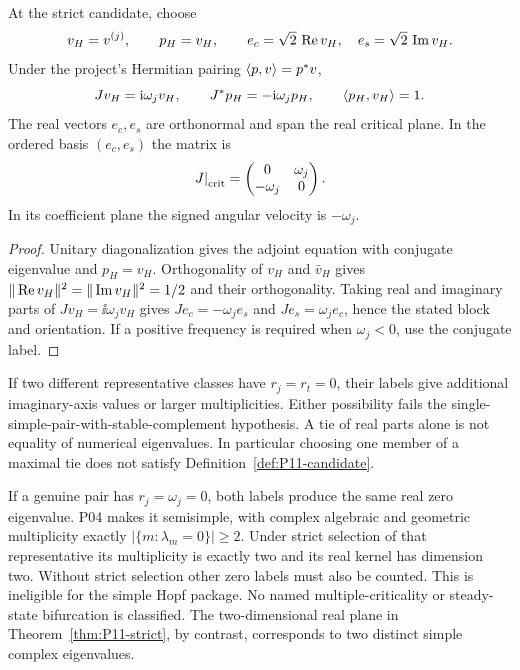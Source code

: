\begin{proposition}
\label{prop:P11-vectors}
At the strict candidate, choose
\begin{equation}
 v_H=v^{(j)},\qquad p_H=v_H,\qquad
 e_c=\sqrt2\,\operatorname{Re} v_H,\quad e_s=\sqrt2\,\operatorname{Im} v_H.
 \label{eq:P11-vectors}
\end{equation}
Under the project's Hermitian pairing $\langle p,v\rangle=p^*v$,
\begin{equation}
 Jv_H=\mathrm{i}\omega_jv_H,\qquad
 J^*p_H=-\mathrm{i}\omega_jp_H,\qquad \langle p_H,v_H\rangle=1.
 \label{eq:P11-adjoint}
\end{equation}
The real vectors $e_c,e_s$ are orthonormal and span the real critical
plane. In the ordered basis $(e_c,e_s)$ the matrix is
\begin{equation}
 \left.J\right|_{\rm crit}=
 \begin{pmatrix}0&\omega_j\\-\omega_j&0\end{pmatrix}.
 \label{eq:P11-real-block}
\end{equation}
In its coefficient plane the signed angular velocity is $-\omega_j$.
\end{proposition}
\begin{proof}
Unitary diagonalization gives the adjoint equation with conjugate
eigenvalue and $p_H=v_H$. Orthogonality of $v_H$ and $\bar v_H$
gives $\|\operatorname{Re} v_H\|^2=\|\operatorname{Im} v_H\|^2=1/2$ and their orthogonality.
Taking real and imaginary parts of $Jv_H=\ii\omega_jv_H$ gives
$Je_c=-\omega_je_s$ and $Je_s=\omega_je_c$, hence the stated block
and orientation. If a positive frequency is required when $\omega_j<0$,
use the conjugate label.
\end{proof}

\begin{remark}
\label{rem:P11-degeneracies}
If two different representative classes have $r_j=r_t=0$, their
labels give additional imaginary-axis values or larger multiplicities.
Either possibility fails the single-simple-pair-with-stable-complement
hypothesis. A tie of real parts alone is not equality of numerical
eigenvalues. In particular choosing one member of a maximal tie does
not satisfy Definition~\ref{def:P11-candidate}.

If a genuine pair has $r_j=\omega_j=0$, both labels produce the
same real zero eigenvalue. P04 makes it semisimple, with complex
algebraic and geometric multiplicity exactly
$|\{m:\lambda_m=0\}|\ge2$. Under strict selection of that
representative its multiplicity is exactly two and its real kernel
has dimension two. Without strict selection other zero labels must
also be counted. This is ineligible for the simple Hopf package.
No named multiple-criticality or steady-state bifurcation is classified.
The two-dimensional real plane in Theorem~\ref{thm:P11-strict}, by
contrast, corresponds to two distinct simple complex eigenvalues.
\end{remark}

